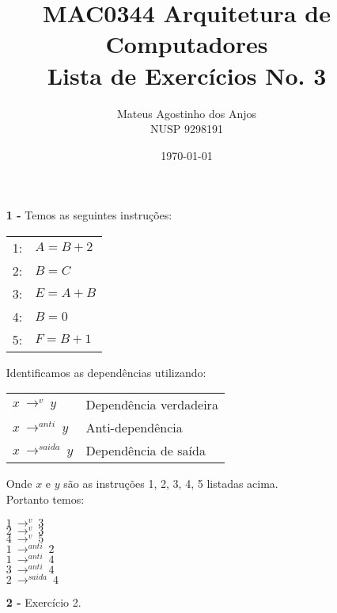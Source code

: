 \documentclass[12pt]{article}
\title{MAC0344 Arquitetura de Computadores\\
Lista de Exercícios No. 3
}
\author{Mateus Agostinho dos Anjos\\NUSP 9298191}
\date{\today}
\begin{document}
	\maketitle
	\begin{itemize}
		\item[\textbf{1 -}]
			\hfill\newline
			Temos as seguintes instruções:		
			\begin{center}
				\begin{tabular}{cl}
					1: & $A = B + 2$\\
					2: & $B = C$\\
					3: & $E = A + B$\\
					4: & $B = 0$\\
					5: & $F = B + 1$\\				
				\end{tabular}			
			\end{center}
			Identificamos as dependências utilizando:\\
			\begin{center}
				\begin{tabular}{ll}
			$x \ \longrightarrow^v \ y$ & Dependência verdadeira\\
			$x \ \longrightarrow^{anti} \ y$ & Anti-dependência\\
			$x \ \longrightarrow^{saida} \ y$ & Dependência de saída\\		
				\end{tabular}			
			\end{center}
			Onde $x$ e $y$ são as instruções {1, 2, 3, 4, 5} listadas
			acima.\\
			
			Portanto temos:\\
			\begin{center}
				$1 \ \longrightarrow^v \ 3$\\
				$2 \ \longrightarrow^v \ 3$\\
				$4 \ \longrightarrow^v \ 5$\\
				\hfill\newline
				$1 \ \longrightarrow^{anti} \ 2$\\
				$1 \ \longrightarrow^{anti} \ 4$\\
				$3 \ \longrightarrow^{anti} \ 4$\\
				\hfill\newline
				$2 \ \longrightarrow^{saida} \ 4$\\
			\end{center}
		\item[\textbf{2 -}]
			\hfill\newline
			Exercício 2.
	\end{itemize}
\end{document}
